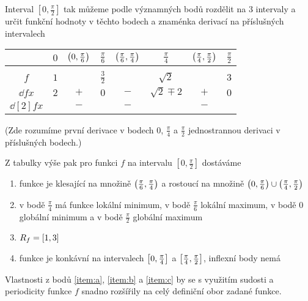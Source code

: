 \documentclass[answers]{exam}
\begin{document}
\begin{questions}
\begin{solution}
\begin{enumerate}
    		Interval $[0, \frac{\pi}{2}]$ tak můžeme podle významných bodů rozdělit na $3$ intervaly a určit funkční hodnoty v těchto bodech a znaménka derivací na příslušných intervalech
    		\begin{center}
	    		\begin{tabular}{c|ccccccc}
	    			& $0$ & $\parens{0, \frac{\pi}{6}}$ & $\frac{\pi}{6}$ & $\parens{\frac{\pi}{6}, \frac{\pi}{4}}$ & $\frac{\pi}{4}$ & $\parens{\frac{\pi}{4}, \frac{\pi}{2}}$ & $\frac{\pi}{2}$ \\[2pt]
	    			\hline \\[-8pt]
	    			$f$ & $1$ & & $\frac{3}{2}$ & & $\sqrt{2}$ & & $3$  \\[3pt]
	    			$\dd{f}{x}$ & $2$ & $+$ & $0$ & $-$ & $\sqrt{2} \mp 2$ & $+$ & $0$ \\[3pt]
	    			$\dd[2]{f}{x}$ & & $-$ & & $-$ & & $-$
	    		\end{tabular}
    		\end{center}
    		(Zde rozumíme  první derivace v bodech $0$, $\frac{\pi}{4}$ a $\frac{\pi}{2}$ jednostrannou derivaci v příslušných bodech.)
    		
    		Z tabulky výše pak pro funkci $f$ na intervalu $[0, \frac{\pi}{2}]$ dostáváme
    		\begin{enumerate}
    			\item \label{item:a} funkce je klesající na množině $\parens{\frac{\pi}{6}, \frac{\pi}{4}}$ a rostoucí na množině $\parens{0, \frac{\pi}{6}} \cup \parens{\frac{\pi}{4}, \frac{\pi}{2}}$
    			\item \label{item:b} v bodě $\frac{\pi}{4}$ má funkce lokální minimum, v bodě $\frac{\pi}{6}$  lokální maximum, v bodě $0$ globální minimum a v bodě $\frac{\pi}{2}$ globální maximum
    			\item $R_f = \brackets{1, 3}$
    			\item \label{item:c} funkce je konkávní na intervalech $\brackets{0, \frac{\pi}{4}}$ a $\brackets{\frac{\pi}{4}, \frac{\pi}{2}}$, inflexní body nemá
    		\end{enumerate}
    		
    		Vlastnosti z bodů \ref{item:a}, \ref{item:b} a \ref{item:c} by se s využitím sudosti a periodicity funkce $f$ snadno rozšířily na celý definiční obor zadané funkce.
    		

\end{enumerate}
\end{solution}
\end{questions}
\end{document}
